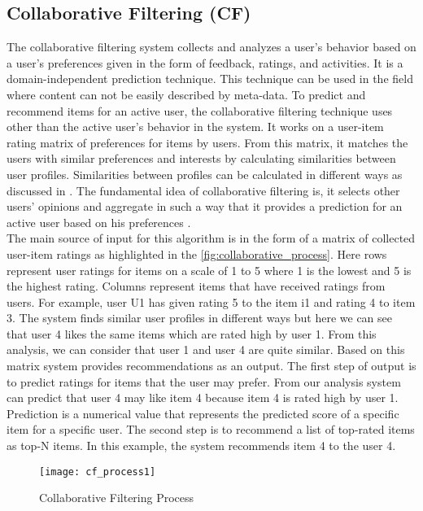 \subsection{Collaborative Filtering (CF)}
The collaborative filtering system collects and analyzes a user's behavior based on a user's preferences given in the form of feedback, ratings, and activities. It is a domain-independent prediction technique. This technique can be used in the field where content can not be easily described by meta-data. To predict and recommend items for an active user, the collaborative filtering technique uses other than the active user's behavior in the system. It works on a user-item rating matrix of preferences for items by users. From this matrix, it matches the users with similar preferences and interests by calculating similarities between user profiles. Similarities between profiles can be calculated in different ways as discussed in . The fundamental idea of collaborative filtering is, it selects other users' opinions and aggregate in such a way that it provides a prediction for an active user based on his preferences \cite{7}.\\
The main source of input for this algorithm is in the form of a matrix of collected user-item ratings as highlighted in the \autoref{fig:collaborative_process}. Here rows represent user ratings for items on a scale of 1 to 5 where 1 is the lowest and 5 is the highest rating. Columns represent items that have received ratings from users. For example, user U1 has given rating 5 to the item i1 and rating 4 to item 3. The system finds similar user profiles in different ways but here we can see that user 4 likes the same items which are rated high by user 1. From this analysis, we can consider that user 1 and user 4 are quite similar. Based on this matrix system provides recommendations as an output. The first step of output is to predict ratings for items that the user may prefer. From our analysis system can predict that user 4 may like item 4 because item 4 is rated high by user 1. Prediction is a numerical value that represents the predicted score of a specific item for a specific user. The second step is to recommend a list of top-rated items as top-N items. In this example, the system recommends item 4 to the user 4.
\\
\begin{figure}[H]
	\centering
	\texttt{[image: cf\_process1]}
	\caption{Collaborative Filtering Process \cite{33}}
	\label{fig:collaborative_process}
\end{figure}


